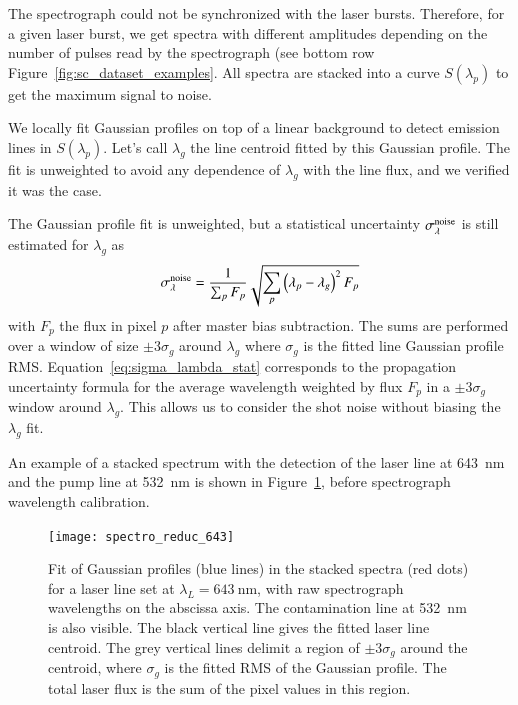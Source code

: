 The spectrograph could not be synchronized with the laser bursts. Therefore, for a given laser burst, we get spectra with different amplitudes depending on the number of pulses read by the spectrograph (see bottom row Figure~\ref{fig:sc_dataset_examples}.
All spectra are stacked into a curve $S(\lambda_p)$ to get the maximum signal to noise.

We locally fit Gaussian profiles on top of a linear background to detect emission lines in $S(\lambda_p)$. Let's call $\lambda_g$ the line centroid fitted by this Gaussian profile. The fit is unweighted to avoid any dependence of $\lambda_g$ with the line flux, and we verified it was the case. 

The Gaussian profile fit is unweighted, but a statistical uncertainty $\sigma_\lambda^{\rm noise}$ is still estimated for $\lambda_g$ as 
\begin{equation}\label{eq:sigma_lambda_stat}
    \sigma_\lambda^{\rm noise}= \dfrac{1}{\sum_p F_p} \sqrt{\sum_p \left(\lambda_p - \lambda_g\right)^2 F_p}
\end{equation}
with $F_p$ the flux in pixel $p$ after master bias subtraction. The sums are performed over a window of size $\pm 3 \sigma_g$ around $\lambda_g$ where $\sigma_g$ is the fitted line Gaussian profile RMS. Equation~\ref{eq:sigma_lambda_stat} corresponds to the propagation uncertainty formula for the average wavelength weighted by flux $F_p$ in a $\pm 3 \sigma_g$  window around $\lambda_g$. This allows us to consider the shot noise without biasing the $\lambda_g$ fit.

An example of a stacked spectrum with the detection of the laser line at \SI{643}{\nm} and the pump line at \SI{532}{\nm} is shown in Figure~\ref{fig:spectro_reduc_643}, before spectrograph wavelength calibration. %

\begin{figure}[!h]
\centering
\texttt{[image: spectro\_reduc\_643]}
\caption{Fit of Gaussian profiles (blue lines) in the stacked spectra (red dots) for a laser line set at $\lambda_L=\SI{643}{\nm}$, with raw spectrograph wavelengths on the abscissa axis. The contamination line at \SI{532}{nm} is also visible. The black vertical line gives the fitted laser line centroid. The grey vertical lines delimit a region of $\pm 3\sigma_g$ around the centroid, where $\sigma_g$ is the fitted RMS of the Gaussian profile. The total laser flux is the sum of the pixel values in this region.}\label{fig:spectro_reduc_643}
\end{figure}



